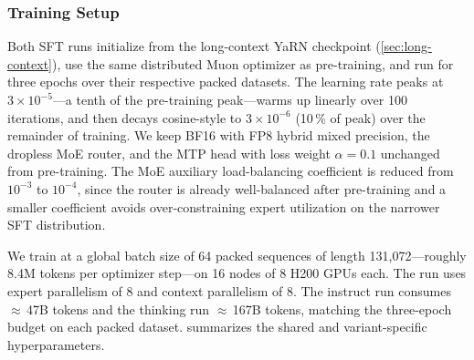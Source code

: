 \documentclass[11pt,a4paper]{article}
\begin{document}
\subsubsection{Training Setup}
\label{sec:sft-training}

Both SFT runs initialize from the long-context YaRN checkpoint
(\cref{sec:long-context}), use the same distributed Muon optimizer as
pre-training, and run for three epochs over their respective packed
datasets. The learning rate peaks at $3{\times}10^{-5}$---a tenth of the
pre-training peak---warms up linearly over 100 iterations, and then
decays cosine-style to $3{\times}10^{-6}$ (10\,\% of peak) over the
remainder of training. We keep BF16 with FP8 hybrid mixed precision, the dropless MoE
router, and the MTP head with loss weight $\alpha = 0.1$ unchanged from
pre-training. The MoE auxiliary load-balancing coefficient is reduced from
$10^{-3}$ to $10^{-4}$, since the router is already well-balanced after
pre-training and a smaller coefficient avoids over-constraining expert
utilization on the narrower SFT distribution.

We train at a global batch size of 64 packed sequences of length
131{,}072—roughly 8.4M tokens per optimizer step—on 16 nodes of 8
H200 GPUs each. The run uses expert parallelism of 8 and context
parallelism of 8. The instruct run consumes $\approx$\,47B tokens and the
thinking run $\approx$\,167B tokens, matching the three-epoch budget on
each packed dataset.  summarizes the shared and
variant-specific hyperparameters.
\end{document}
